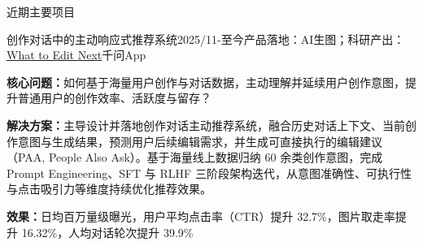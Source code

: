 \documentclass{resume} %
\begin{document}
\begin{rSection}{近期主要项目}
\begin{rSubsection}{\hspace*{-1.5em}创作对话中的主动响应式推荐系统}{2025/11-至今}{产品落地：AI生图；科研产出：\href{https://what-to-edit-next.github.io/}{What to Edit Next}}{千问App}
\item {\bf 核心问题：}如何基于海量用户创作与对话数据，主动理解并延续用户创作意图，提升普通用户的创作效率、活跃度与留存？
\item {\bf 解决方案：}主导设计并落地创作对话主动推荐系统，融合历史对话上下文、当前创作意图与生成结果，预测用户后续编辑需求，并生成可直接执行的编辑建议（PAA, People Also Ask）。基于海量线上数据归纳 60 余类创作意图，完成 Prompt Engineering、SFT 与 RLHF 三阶段架构迭代，从意图准确性、可执行性与点击吸引力等维度持续优化推荐效果。
\item {\bf 效果：}日均百万量级曝光，用户平均点击率（CTR）提升 32.7\%，图片取走率提升 16.32\%，人均对话轮次提升 39.9\%
\end{rSubsection}



\end{rSection}
\end{document}
